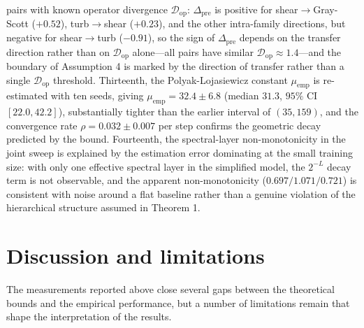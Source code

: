 \documentclass[preprint,12pt]{elsarticle}
\begin{document}
pairs with known operator divergence $\mathcal{D}_{\mathrm{op}}$: $\Delta_{\mathrm{pre}}$ is positive for shear$\to$Gray-Scott ($+0.52$), turb$\to$shear ($+0.23$), and the other intra-family directions, but negative for shear$\to$turb ($-0.91$), so the sign of $\Delta_{\mathrm{pre}}$ depends on the transfer direction rather than on $\mathcal{D}_{\mathrm{op}}$ alone---all pairs have similar $\mathcal{D}_{\mathrm{op}}\approx1.4$---and the boundary of Assumption 4 is marked by the direction of transfer rather than a single $\mathcal{D}_{\mathrm{op}}$ threshold. Thirteenth, the Polyak-Lojasiewicz constant $\mu_{\mathrm{emp}}$ is re-estimated with ten seeds, giving $\mu_{\mathrm{emp}}=32.4\pm6.8$ (median $31.3$, $95\%$ CI $[22.0,42.2]$), substantially tighter than the earlier interval of $(35,159)$, and the convergence rate $\rho=0.032\pm0.007$ per step confirms the geometric decay predicted by the bound. Fourteenth, the spectral-layer non-monotonicity in the joint sweep is explained by the estimation error dominating at the small training size: with only one effective spectral layer in the simplified model, the $2^{-L}$ decay term is not observable, and the apparent non-monotonicity ($0.697/1.071/0.721$) is consistent with noise around a flat baseline rather than a genuine violation of the hierarchical structure assumed in Theorem 1.

\section{Discussion and limitations}
The measurements reported above close several gaps between the theoretical bounds and the empirical
performance, but a number of limitations remain that shape the interpretation of the results.
\end{document}
